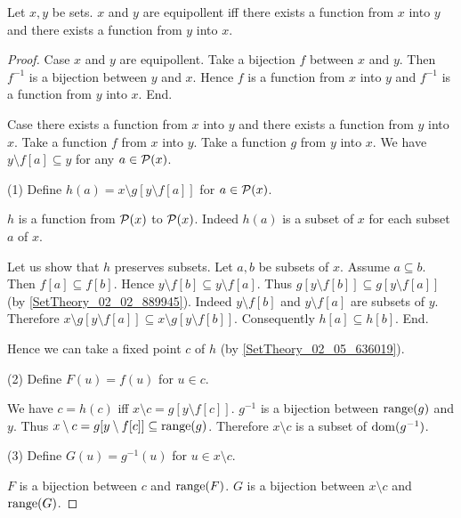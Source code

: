 \documentclass{article}
\begin{document}
  \begin{forthel}
    \begin{theorem}
      Let $x,y$ be sets.
      $x$ and $y$ are equipollent iff there exists a function from $x$ into $y$ and there exists a function from $y$ into $x$.
    \end{theorem}
    \begin{proof}
      Case $x$ and $y$ are equipollent.
        Take a bijection $f$ between $x$ and $y$.
        Then $f^{-1}$ is a bijection between $y$ and $x$.
        Hence $f$ is a function from $x$ into $y$ and $f^{-1}$ is a function from $y$ into $x$.
      End.

      Case there exists a function from $x$ into $y$ and there exists a function from $y$ into $x$.
        Take a function $f$ from $x$ into $y$.
        Take a function $g$ from $y$ into $x$.
        We have $y \setminus f[a] \subseteq y$ for any $a \in \mathcal{P}(x)$.

        (1) Define $h(a) = x \setminus g[y \setminus f[a]]$ for $a \in \mathcal{P}(x)$.

        $h$ is a function from $\mathcal{P}(x)$ to $\mathcal{P}(x)$.
        Indeed $h(a)$ is a subset of $x$ for each subset $a$ of $x$.

        Let us show that $h$ preserves subsets.
          Let $a,b$ be subsets of $x$.
          Assume $a \subseteq b$.
          Then $f[a] \subseteq f[b]$.
          Hence $y \setminus f[b] \subseteq y \setminus f[a]$.
          Thus $g[y \setminus f[b]] \subseteq g[y \setminus f[a]]$ (by \ref{SetTheory_02_02_889945}).
          Indeed $y \setminus f[b]$ and $y \setminus f[a]$ are subsets of $y$.
          Therefore $x \setminus g[y \setminus f[a]] \subseteq x \setminus g[y \setminus f[b]]$.
          Consequently $h[a] \subseteq h[b]$.
        End.

        Hence we can take a fixed point $c$ of $h$ (by \ref{SetTheory_02_05_636019}).

        (2) Define $F(u) = f(u)$ for $u \in c$.

        We have $c = h(c)$ iff $x \setminus c = g[y \setminus f[c]]$.
        $g^{-1}$ is a bijection between $\operatorname{range}(g)$ and $y$.
        Thus $x \setminus c = g[y \setminus f[c]] \subseteq \operatorname{range}(g)$.
        Therefore $x \setminus c$ is a subset of $\operatorname{dom}(g^{-1})$.

        (3) Define $G(u) = g^{-1}(u)$ for $u \in x \setminus c$.

        $F$ is a bijection between $c$ and $\operatorname{range}(F)$.
        $G$ is a bijection between $x \setminus c$ and $\operatorname{range}(G)$.


\end{proof}
\end{forthel}
\end{document}
